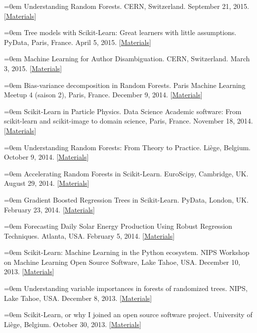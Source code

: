 \documentclass{scrartcl}
\newcommand{\MarginText}[1]{\marginpar{\raggedleft\itshape\small#1}}
\newcommand{\NewPublication}[4]{\noindent\hangindent=0em\hangafter=0 \MarginText{\color{black} #1}{\footnotesize [{\color{Maroon}#2}]} #3 {\footnotesize\color{gray}#4}\vspace{0.5em}}
\begin{document}
\begin{cv}{}
\NewPublication{}{15}{Understanding Random Forests.}{%
CERN, Switzerland.
September 21, 2015.
[\href{https://github.com/glouppe/talk-pydata2015}{Materials}]}

\NewPublication{}{14}{Tree models with Scikit-Learn: Great learners with little assumptions.}{%
PyData, Paris, France.
April 5, 2015.
[\href{https://github.com/glouppe/talk-pydata2015}{Materials}]}

\NewPublication{}{13}{Machine Learning for Author Disambiguation.}{%
CERN, Switzerland.
March 3, 2015.
[\href{https://github.com/glouppe/talk-disambiguation-inspire}{Materials}]}

\NewPublication{}{12}{Bias-variance decomposition in Random Forests.}{%
Paris Machine Learning Meetup 4 (saison 2), Paris, France.
December 9, 2014.
[\href{http://hdl.handle.net/2268/174897}{Materials}]}

\NewPublication{}{11}{Scikit-Learn in Particle Physics.}{%
Data Science Academic software: From scikit-learn and scikit-image to domain science, Paris, France.
November 18, 2014.
[\href{https://github.com/glouppe/talk-cds2014}{Materials}]}

\NewPublication{}{10}{Understanding Random Forests: From Theory to Practice.}{%
Li{\`e}ge, Belgium.
October 9, 2014.
[\href{https://github.com/glouppe/phd-thesis}{Materials}]}

\NewPublication{}{9}{Accelerating Random Forests in Scikit-Learn.}{%
EuroScipy, Cambridge, UK.
August 29, 2014.
[\href{https://github.com/glouppe/talk-euroscipy2014}{Materials}]}

\NewPublication{}{8}{Gradient Boosted Regression Trees in Scikit-Learn.}{%
PyData, London, UK.
February 23, 2014.
[\href{https://github.com/glouppe/tutorial-pydata2014}{Materials}]}

\NewPublication{}{7}{Forecasting Daily Solar Energy Production Using Robust Regression Techniques.}{%
Atlanta, USA.
February 5, 2014.
[\href{http://hdl.handle.net/2268/162797}{Materials}]}

\NewPublication{}{6}{Scikit-Learn: Machine Learning in the Python ecosystem.}{%
NIPS Workshop on Machine Learning Open Source Software,
Lake Tahoe, USA.
December 10, 2013.
[\href{http://hdl.handle.net/2268/157487}{Materials}]}

\NewPublication{}{5}{Understanding variable importances in forests of randomized trees.}{%
NIPS,
Lake Tahoe, USA.
December 8, 2013.
[\href{http://hdl.handle.net/2268/155642}{Materials}]}

\NewPublication{}{4}{Scikit-Learn, or why I joined an open source software project.}{%
University of Li{\`e}ge, Belgium.
October 30, 2013.
[\href{http://www.slideshare.net/glouppe/scikitlearn-or-why-i-joined-an-open-source-software-project}{Materials}]}


\end{cv}
\end{document}
